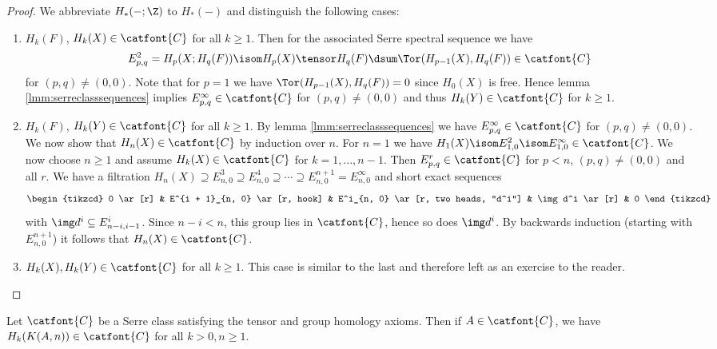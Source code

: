 \begin{proof}
	We abbreviate $H_*({{-}}; \Z)$ to $H_*({{-}})$ and distinguish the following cases:
	\begin{enumerate}
		\item $H_k(F)$, $H_k(X) \in \catfont{C}$ for all $k \geq 1$.
			Then for the associated Serre spectral sequence we have
			\begin{equation*}
				E^2_{p, q} = H_p(X; H_q(F)) \isom H_p(X) \tensor H_q(F) \dsum \Tor(H_{p - 1}(X), H_q(F)) \in \catfont{C}
			\end{equation*}
			for $(p, q) \neq (0, 0)$.
			Note that for $p = 1$ we have $\Tor(H_{p - 1}(X), H_q(F)) = 0$ since $H_0(X)$ is free.
			Hence lemma \ref{lmm:serreclasssequences} implies $E^\infty_{p, q} \in \catfont{C}$ for $(p, q) \neq (0, 0)$ and thus $H_k(Y) \in \catfont{C}$ for $k \geq 1$.
		\item $H_k(F)$, $H_k(Y) \in \catfont{C}$ for all $k \geq 1$.
			By lemma \ref{lmm:serreclasssequences} we have $E^\infty_{p, q} \in \catfont{C}$ for $(p, q) \neq (0, 0)$.
			We now show that $H_n(X) \in \catfont{C}$ by induction over $n$.
			For $n = 1$ we have $H_1(X) \isom E^2_{1, 0} \isom E^\infty_{1, 0} \in \catfont{C}$.
			We now choose $n \geq 1$ and assume $H_k(X) \in \catfont{C}$ for $k = 1, \ldots, n - 1$.
			Then $E^r_{p, q} \in \catfont{C}$ for $p < n$, $(p, q) \neq (0, 0)$ and all $r$.
			We have a filtration $H_n(X) \supseteq E^3_{n, 0} \supseteq E^4_{n, 0} \supseteq \cdots \supseteq E^{n + 1}_{n, 0} = E_{n, 0}^\infty$ and short exact sequences
			\begin{equation*}
				\begin{tikzcd}
					0
							\ar[r]
						& E^{i + 1}_{n, 0}
							\ar[r, hook]
						& E^i_{n, 0}
							\ar[r, two heads, "d^i"]
						& \img d^i
							\ar[r]
						& 0
				\end{tikzcd}
			\end{equation*}
			with $\img d^i \subseteq E^i_{n - i, i - 1}$.
			Since $n - i < n$, this group lies in $\catfont{C}$, hence so does $\img d^i$.
			By backwards induction (starting with $E^{n + 1}_{n, 0}$) it follows that $H_n(X) \in \catfont{C}$.
		\item $H_k(X), H_k(Y) \in \catfont{C}$ for all $k \geq 1$.
			This case is similar to the last and therefore left as an exercise to the reader.
			\qedhere
	\end{enumerate}
\end{proof}
\begin{corollary}\label{crl:maclanespaceserreclass}
	Let $\catfont{C}$ be a Serre class satisfying the tensor and group homology axioms.
	Then if $A \in \catfont{C}$, we have $H_k(K(A, n)) \in \catfont{C}$ for all $k > 0, n \geq 1$.
\end{corollary}
